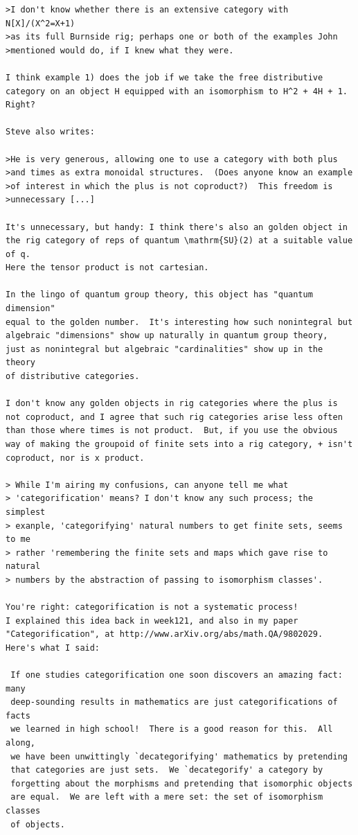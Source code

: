 \documentclass{article}
\begin{document}
\begin{verbatim}
>I don't know whether there is an extensive category with N[X]/(X^2=X+1) 
>as its full Burnside rig; perhaps one or both of the examples John 
>mentioned would do, if I knew what they were.

I think example 1) does the job if we take the free distributive
category on an object H equipped with an isomorphism to H^2 + 4H + 1.
Right?

Steve also writes:

>He is very generous, allowing one to use a category with both plus 
>and times as extra monoidal structures.  (Does anyone know an example 
>of interest in which the plus is not coproduct?)  This freedom is 
>unnecessary [...]

It's unnecessary, but handy: I think there's also an golden object in 
the rig category of reps of quantum \mathrm{SU}(2) at a suitable value of q.  
Here the tensor product is not cartesian.  

In the lingo of quantum group theory, this object has "quantum dimension"
equal to the golden number.  It's interesting how such nonintegral but 
algebraic "dimensions" show up naturally in quantum group theory, 
just as nonintegral but algebraic "cardinalities" show up in the theory 
of distributive categories.  

I don't know any golden objects in rig categories where the plus is
not coproduct, and I agree that such rig categories arise less often
than those where times is not product.  But, if you use the obvious 
way of making the groupoid of finite sets into a rig category, + isn't 
coproduct, nor is x product.  

> While I'm airing my confusions, can anyone tell me what
> 'categorification' means? I don't know any such process; the simplest
> exanple, 'categorifying' natural numbers to get finite sets, seems to me
> rather 'remembering the finite sets and maps which gave rise to natural
> numbers by the abstraction of passing to isomorphism classes'.

You're right: categorification is not a systematic process!  
I explained this idea back in week121, and also in my paper
"Categorification", at http://www.arXiv.org/abs/math.QA/9802029.  
Here's what I said:

 If one studies categorification one soon discovers an amazing fact: many
 deep-sounding results in mathematics are just categorifications of facts
 we learned in high school!  There is a good reason for this.  All along,
 we have been unwittingly `decategorifying' mathematics by pretending
 that categories are just sets.  We `decategorify' a category by
 forgetting about the morphisms and pretending that isomorphic objects
 are equal.  We are left with a mere set: the set of isomorphism classes
 of objects. 


\end{verbatim}
\end{document}

